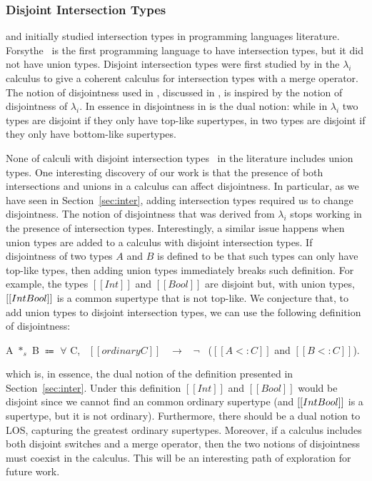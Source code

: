 \subsubsection*{Disjoint Intersection Types}
\citet{pottinger1980type} and \citet{coppo1981functional} initially
studied intersection types in programming languages
literature. Forsythe~\cite{reynolds1988preliminary} is the first 
programming language to have intersection types, but it did not
have union types.  Disjoint intersection types were first
studied by \citet{oliveira2016disjoint} in the $\lambda_{i}$ calculus
to give a coherent calculus for intersection types with a merge
operator. The notion of disjointness used in \cal, discussed in ,
is inspired by the notion of disjointness of $\lambda_{i}$. In essence in
disjointness in \cal is the dual notion: while in $\lambda_{i}$ two types
are disjoint if they only have top-like supertypes, in \cal two types
are disjoint if they only have bottom-like supertypes.

None of calculi with disjoint intersection types~\cite{} in the literature
includes union types. One interesting discovery of our work is that the
presence of both intersections and unions in a calculus can affect disjointness.
In particular, as we have seen in Section~\ref{sec:inter}, adding intersection types
required us to change disjointness. The notion of disjointness that was
derived from $\lambda_{i}$ stops working in the presence of intersection types.
Interestingly, a similar issue happens when union types are added to
a calculus with disjoint intersection types. If disjointness of two types $A$
and $B$ is defined to be that such types can only have top-like types,
then adding union types immediately breaks such definition.
For example, the types $[[Int]]$ and $[[Bool]]$ are disjoint but, with union
types, $[[Int \/ Bool]]$ is a common supertype that is not top-like.
We conjecture that, to add union types to disjoint intersection types,
we can use the following definition of disjointness:

\begin{definition}
\label{def:related:disj}
  A $*_s$ B $\Coloneqq$ $\forall$ C, \ $[[ordinary C]]$ \ $\rightarrow$ \ $\neg$ \ ($[[A <: C]]$ and $[[B <: C]]$).
\end{definition}

\noindent which is, in essence, the dual notion of the definition presented in
Section~\ref{sec:inter}. Under this definition $[[Int]]$ and $[[Bool]]$ would
be disjoint since we cannot find an common ordinary supertype (and $[[Int \/ Bool]]$
is a supertype, but it is not ordinary). Furthermore, there should be a
dual notion to LOS, capturing the greatest ordinary supertypes. Moreover,
if a calculus includes both disjoint switches and a merge operator,
then the two notions of disjointness must coexist in the calculus. 
This will be an interesting path of exploration for future work.

